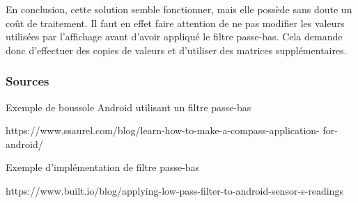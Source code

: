 \documentclass[francais,12pt]{article}
\begin{document}
	En conclusion, cette solution semble fonctionner, mais elle possède sans doute un coût de traitement. Il faut en effet faire attention de ne pas modifier les valeurs utilisées par l'affichage avant d'avoir appliqué le filtre passe-bas. Cela demande donc d'effectuer des copies de valeurs et d'utiliser des matrices supplémentaires. 
	
	\subsubsection*{Sources}
	Exemple de boussole Android utilisant un filtre passe-bas
	
	https://www.ssaurel.com/blog/learn-how-to-make-a-compass-application-
		for-android/
	
	Exemple d'implémentation de filtre passe-bas
	
	https://www.built.io/blog/applying-low-pass-filter-to-android-sensor-s-readings
	
	
\end{document}

